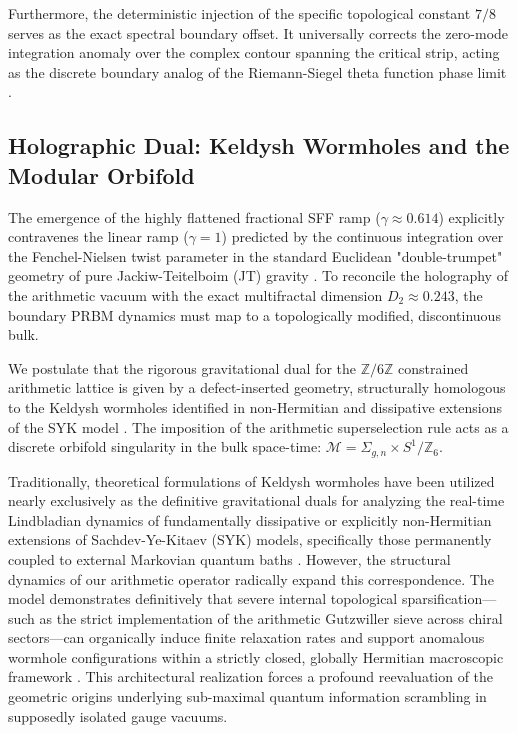 \documentclass[aps,prl,preprint,superscriptaddress,floatfix]{revtex4-2}
\newcommand{\Zmod}{\mathbb{Z}/6\mathbb{Z}}
\begin{document}
Furthermore, the deterministic injection of the specific topological constant $7/8$ serves as the exact spectral boundary offset. It universally corrects the zero-mode integration anomaly over the complex contour spanning the critical strip, acting as the discrete boundary analog of the Riemann-Siegel theta function phase limit \cite{Corless1996, Borwein2008}.

\subsection{Holographic Dual: Keldysh Wormholes and the Modular Orbifold}

The emergence of the highly flattened fractional SFF ramp ($\gamma \approx 0.614$) explicitly contravenes the linear ramp ($\gamma = 1$) predicted by the continuous integration over the Fenchel-Nielsen twist parameter in the standard Euclidean "double-trumpet" geometry of pure Jackiw-Teitelboim (JT) gravity \cite{Saad2019, Cotler2017}. To reconcile the holography of the arithmetic vacuum with the exact multifractal dimension $D_2 \approx 0.243$, the boundary PRBM dynamics must map to a topologically modified, discontinuous bulk.

We postulate that the rigorous gravitational dual for the $\Zmod$ constrained arithmetic lattice is given by a defect-inserted geometry, structurally homologous to the Keldysh wormholes identified in non-Hermitian and dissipative extensions of the SYK model \cite{Zheng2023b, GarciaGarcia2023, Arias2024}. The imposition of the arithmetic superselection rule acts as a discrete orbifold singularity in the bulk space-time: $\mathcal{M} = \Sigma_{g,n} \times S^1 / \mathbb{Z}_6$.

Traditionally, theoretical formulations of Keldysh wormholes have been utilized nearly exclusively as the definitive gravitational duals for analyzing the real-time Lindbladian dynamics of fundamentally dissipative or explicitly non-Hermitian extensions of Sachdev-Ye-Kitaev (SYK) models, specifically those permanently coupled to external Markovian quantum baths \cite{GarciaGarcia2023, Zheng2023b}. However, the structural dynamics of our arithmetic operator radically expand this correspondence. The model demonstrates definitively that severe internal topological sparsification—such as the strict implementation of the arithmetic Gutzwiller sieve across chiral sectors—can organically induce finite relaxation rates and support anomalous wormhole configurations within a strictly closed, globally Hermitian macroscopic framework \cite{Bhattacharjee2025}. This architectural realization forces a profound reevaluation of the geometric origins underlying sub-maximal quantum information scrambling in supposedly isolated gauge vacuums.
\end{document}
